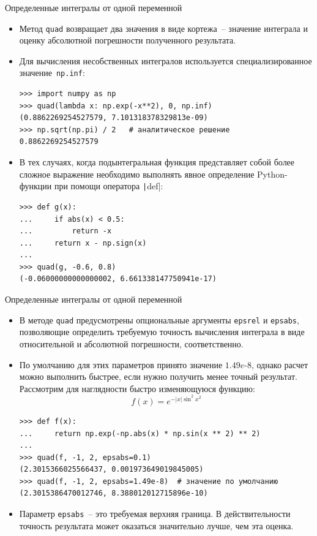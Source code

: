 \documentclass[aspectratio=169, mathserif]{beamer}	%
\begin{document}
\begin{frame}[fragile, label=c]{Определенные интегралы от одной переменной}
\scriptsize
\begin{itemize}
	\item Метод \texttt{quad} возвращает два значения в виде кортежа~-- значение интеграла и оценку абсолютной погрешности полученного результата.
	\item Для вычисления несобственных интегралов используется специализированное значение~\texttt{np.inf}:
\vfill
\begin{verbatim}
>>> import numpy as np
>>> quad(lambda x: np.exp(-x**2), 0, np.inf)
(0.8862269254527579, 7.101318378329813e-09)
>>> np.sqrt(np.pi) / 2   # аналитическое решение
0.8862269254527579
\end{verbatim}
\vfill
	\item В тех случаях, когда подынтегральная функция представляет собой более сложное выражение необходимо выполнять явное определение Python-функции при помощи оператора \texttt|def|:
\vfill
\begin{verbatim}
>>> def g(x):
...     if abs(x) < 0.5:
...         return -x
...     return x - np.sign(x)
...
>>> quad(g, -0.6, 0.8)
(-0.06000000000000002, 6.661338147750941e-17)
\end{verbatim}
\end{itemize}
\vfill
\end{frame}

\begin{frame}[fragile, label=c]{Определенные интегралы от одной переменной}
\scriptsize
\begin{itemize}
	\item В методе \texttt{quad} предусмотрены опциональные аргументы \texttt{epsrel} и \texttt{epsabs}, позволяющие определить требуемую точность вычисления интеграла в виде относительной и абсолютной погрешности, соответственно.
	\item По умолчанию для этих параметров принято значение $1.49e\text{-}8$, однако расчет можно выполнить быстрее, если нужно получить менее точный результат.
	Рассмотрим для наглядности быстро изменяющуюся функцию:
\vfill
$$
	f(x) = e^{-|x|\sin^2x^2}
$$
\vfill
\begin{verbatim}
>>> def f(x):
...     return np.exp(-np.abs(x) * np.sin(x ** 2) ** 2)
...
>>> quad(f, -1, 2, epsabs=0.1)
(2.3015366025566437, 0.001973649019845005)
>>> quad(f, -1, 2, epsabs=1.49e-8)  # значение по умолчанию
(2.3015386470012746, 8.388012012715896e-10)
\end{verbatim}
\vfill
	\item Параметр \texttt{epsabs}~-- это требуемая верхняя граница. В действительности точность результата может оказаться значительно лучше, чем эта оценка.
\end{itemize}
\vfill
\end{frame}
\end{document}

